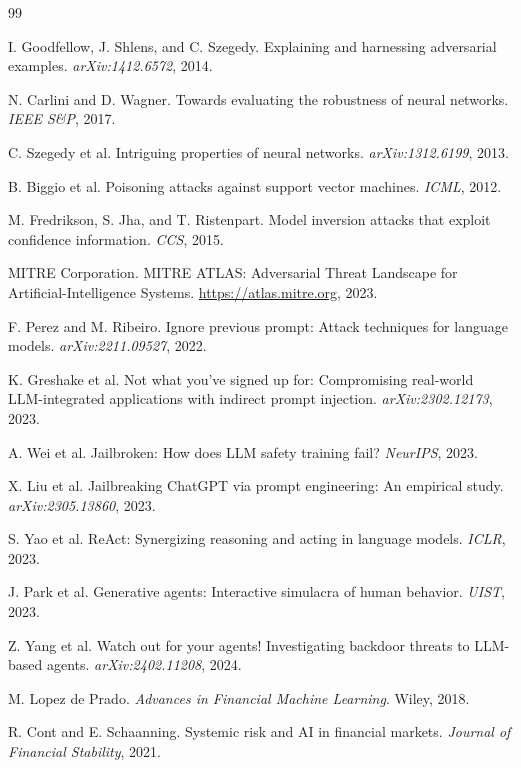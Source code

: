 \documentclass[11pt,a4paper]{article}
\begin{document}

\begin{thebibliography}{99}

I. Goodfellow, J. Shlens, and C. Szegedy.
Explaining and harnessing adversarial examples.
\textit{arXiv:1412.6572}, 2014.

N. Carlini and D. Wagner.
Towards evaluating the robustness of neural networks.
\textit{IEEE S\&P}, 2017.

C. Szegedy et al.
Intriguing properties of neural networks.
\textit{arXiv:1312.6199}, 2013.

B. Biggio et al.
Poisoning attacks against support vector machines.
\textit{ICML}, 2012.

M. Fredrikson, S. Jha, and T. Ristenpart.
Model inversion attacks that exploit confidence information.
\textit{CCS}, 2015.

MITRE Corporation.
MITRE ATLAS: Adversarial Threat Landscape for Artificial-Intelligence Systems.
\url{https://atlas.mitre.org}, 2023.

F. Perez and M. Ribeiro.
Ignore previous prompt: Attack techniques for language models.
\textit{arXiv:2211.09527}, 2022.

K. Greshake et al.
Not what you've signed up for: Compromising real-world LLM-integrated
applications with indirect prompt injection.
\textit{arXiv:2302.12173}, 2023.

A. Wei et al.
Jailbroken: How does LLM safety training fail?
\textit{NeurIPS}, 2023.

X. Liu et al.
Jailbreaking ChatGPT via prompt engineering: An empirical study.
\textit{arXiv:2305.13860}, 2023.

S. Yao et al.
ReAct: Synergizing reasoning and acting in language models.
\textit{ICLR}, 2023.

J. Park et al.
Generative agents: Interactive simulacra of human behavior.
\textit{UIST}, 2023.

Z. Yang et al.
Watch out for your agents! Investigating backdoor threats to LLM-based agents.
\textit{arXiv:2402.11208}, 2024.

M. Lopez de Prado.
\textit{Advances in Financial Machine Learning}.
Wiley, 2018.

R. Cont and E. Schaanning.
Systemic risk and AI in financial markets.
\textit{Journal of Financial Stability}, 2021.

\end{thebibliography}
\end{document}
